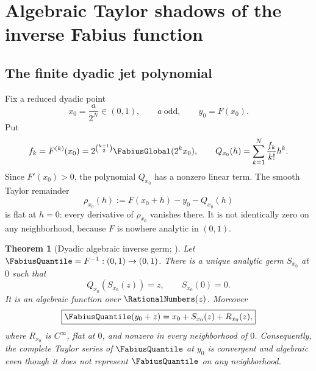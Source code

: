\documentclass[11pt,oneside]{article}
\numberwithin{equation}{section}
\newtheorem{theorem}{Theorem}[section]
\theoremstyle{definition}
\theoremstyle{remark}
\begin{document}
\section{Algebraic Taylor shadows of the inverse Fabius function}
\label{p2:sec:inverse-germs}

\subsection{The finite dyadic jet polynomial}

Fix a reduced dyadic point
\begin{equation}
 x_0=\frac{a}{2^N}\in(0,1),\qquad a\ \text{odd},
 \qquad y_0=F(x_0).
 \label{p2:eq:x0-y0}
\end{equation}
Put
\begin{equation}
 f_k=F^{(k)}(x_0)
 =2^{\binom{k+1}{2}}\FabiusGlobal(2^kx_0),
 \qquad
 Q_{x_0}(h)=\sum_{k=1}^{N}\frac{f_k}{k!}h^k.
 \label{p2:eq:Q-dyadic}
\end{equation}
Since $F'(x_0)>0$, the polynomial $Q_{x_0}$ has a nonzero linear term.  The smooth Taylor
remainder
\begin{equation}
 \rho_{x_0}(h):=F(x_0+h)-y_0-Q_{x_0}(h)
 \label{p2:eq:rho-flat}
\end{equation}
is flat at $h=0$: every derivative of $\rho_{x_0}$ vanishes there.  It is not identically zero on any
neighborhood, because $F$ is nowhere analytic in $(0,1)$.

\begin{theorem}[Dyadic algebraic inverse germ; \statusnew]
\label{p2:thm:algebraic-inverse-germ}
Let $\FabiusQuantile=F^{-1}:(0,1)\to(0,1)$.  There is a unique analytic germ $S_{x_0}$ at $0$ such that
\begin{equation}
 Q_{x_0}(S_{x_0}(z))=z,
 \qquad S_{x_0}(0)=0.
 \label{p2:eq:S-inverse}
\end{equation}
It is an algebraic function over $\RationalNumbers(z)$.  Moreover
\begin{equation}
 \boxed{
 \FabiusQuantile(y_0+z)=x_0+S_{x_0}(z)+R_{x_0}(z),
 }
 \label{p2:eq:G-shadow}
\end{equation}
where $R_{x_0}$ is $C^\infty$, flat at $0$, and nonzero in every neighborhood of $0$.
Consequently, the complete Taylor series of $\FabiusQuantile$ at $y_0$ is convergent and algebraic even
though it does not represent $\FabiusQuantile$ on any neighborhood.
\end{theorem}
\end{document}

